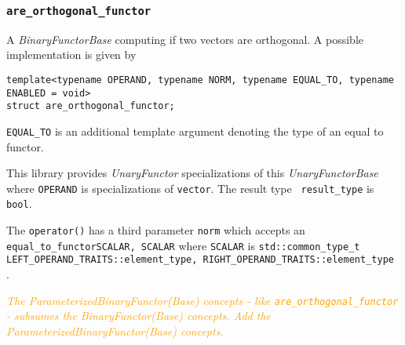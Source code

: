 \documentclass[oneside]{book}
\begin{document}
\subsubsection{\texttt{are\_orthogonal\_functor}}
A \textit{BinaryFunctorBase} computing if two vectors are orthogonal.
A possible implementation is given by
\begin{verbatim}
template<typename OPERAND, typename NORM, typename EQUAL_TO, typename ENABLED = void>
struct are_orthogonal_functor;
\end{verbatim}
\texttt{EQUAL\_TO} is an additional template argument denoting the type of an equal to functor.\newline

This library provides \textit{UnaryFunctor} specializations of this \textit{UnaryFunctorBase}
where \texttt{OPERAND} is specializations of \texttt{vector}. The result type        \texttt{
result\_type} is \texttt{bool}.\newline

The \texttt{operator()} has a third parameter \texttt{norm}   which accepts an
\texttt{equal\_to\_functor\textlangle SCALAR, SCALAR\textrangle}         where
\texttt{SCALAR} is \texttt{std::common\_type\_t                    \textlangle
LEFT\_OPERAND\_TRAITS::element\_type,    RIGHT\_OPERAND\_TRAITS::element\_type
\textrangle}.\newline

\textit{\textcolor{orange}{The \textit{ParameterizedBinaryFunctor(Base)} concepts - like
\texttt{are\_orthogonal\_functor} - subsumes the \textit{BinaryFunctor(Base)}  concepts.
Add the \textit{ParameterizedBinaryFunctor(Base) concepts.}}}
\end{document}
